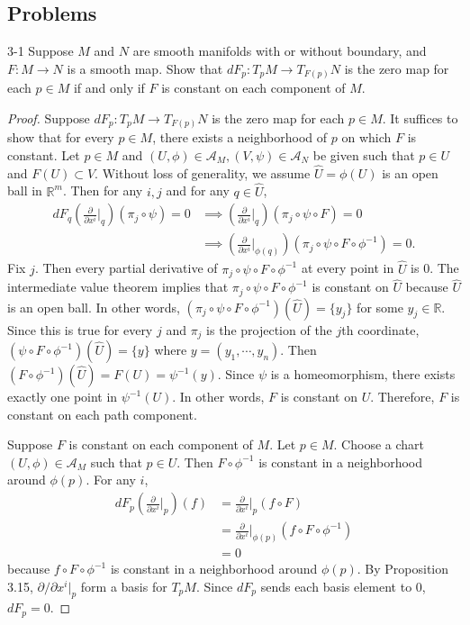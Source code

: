 \subsection{Problems}

\begin{customprob}{3-1}
  Suppose $M$ and $N$ are smooth manifolds with or without boundary, and $F: M \rightarrow N$ is a smooth map.
  Show that $dF_p: T_pM \rightarrow T_{F(p)}N$ is the zero map for each $p \in M$ if and only if $F$ is constant on each component of $M$.
\end{customprob}

\begin{proof}
  Suppose $dF_p: T_pM \rightarrow T_{F(p)}N$ is the zero map for each $p \in M$.
  It suffices to show that for every $p \in M$, there exists a neighborhood of $p$ on which $F$ is constant.
  Let $p \in M$ and $(U, \phi) \in \mathcal{A}_M, (V, \psi) \in \mathcal{A}_N$ be given such that $p \in U$ and $F(U) \subset V$.
  Without loss of generality, we assume $\hat{U} = \phi(U)$ is an open ball in $\mathbb{R}^m$.
  Then for any $i, j$ and for any $q \in \hat{U}$,
  \begin{align*}
    dF_q(\frac{\partial}{\partial x^i}\vert_q)(\pi_j \circ \psi) = 0
      &\implies (\frac{\partial}{\partial x^i}\vert_q)(\pi_j \circ \psi \circ F) = 0 \\
      &\implies (\frac{\partial}{\partial x^i}\vert_{\phi(q)})(\pi_j \circ \psi \circ F \circ \phi^{-1}) = 0.
  \end{align*}
  Fix $j$.
  Then every partial derivative of $\pi_j \circ \psi \circ F \circ \phi^{-1}$ at every point in $\hat{U}$ is 0.
  The intermediate value theorem implies that $\pi_j \circ \psi \circ F \circ \phi^{-1}$ is constant on $\hat{U}$ because $\hat{U}$ is an open ball.
  In other words, $(\pi_j \circ \psi \circ F \circ \phi^{-1})(\hat{U}) = \{ y_j \}$ for some $y_j \in \mathbb{R}$.
  Since this is true for every $j$ and $\pi_j$ is the projection of the $j$th coordinate, $(\psi \circ F \circ \phi^{-1})(\hat{U}) = \{ y \}$ where $y = (y_1, \cdots, y_n)$.
  Then $(F \circ \phi^{-1})(\hat{U}) = F(U) = \psi^{-1}(y)$.
  Since $\psi$ is a homeomorphism, there exists exactly one point in $\psi^{-1}(U)$.
  In other words, $F$ is constant on $U$.
  Therefore, $F$ is constant on each path component.

  Suppose $F$ is constant on each component of $M$.
  Let $p \in M$.
  Choose a chart $(U, \phi) \in \mathcal{A}_M$ such that $p \in U$.
  Then $F \circ \phi^{-1}$ is constant in a neighborhood around $\phi(p)$.
  For any $i$,
  \begin{align*}
    dF_p(\frac{\partial}{\partial x^i}\vert_p)(f)
      &= \frac{\partial}{\partial x^i}\vert_p(f \circ F) \\
      &= \frac{\partial}{\partial x^i}\vert_{\phi(p)}(f \circ F \circ \phi^{-1}) \\
      &= 0
  \end{align*}
  because $f \circ F \circ \phi^{-1}$ is constant in a neighborhood around $\phi(p)$.
  By Proposition 3.15, $\partial / \partial x^i\vert_p$ form a basis for $T_pM$.
  Since $dF_p$ sends each basis element to 0, $dF_p = 0$.
\end{proof}

